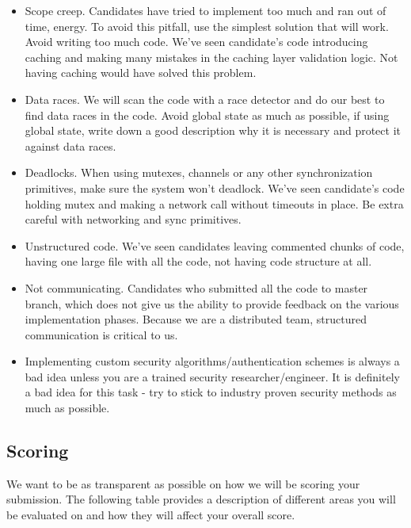 \documentclass{article}
\begin{document}
    \begin{itemize}
    \item Scope creep. Candidates have tried to implement too much and ran out of time, energy. To avoid this pitfall, use the simplest solution that will work. Avoid writing too much code. We've seen candidate's code introducing caching and making many mistakes in the caching layer validation logic. Not having caching would have solved this problem.
    \item Data races. We will scan the code with a race detector and do our best to find data races in the code. Avoid global state as much as possible, if using global state, write down a good description why it is necessary and protect it against data races.
    \item Deadlocks. When using mutexes, channels or any other synchronization primitives, make sure the system won't deadlock. We've seen candidate's code holding mutex and making a network call without timeouts in place. Be extra careful with networking and sync primitives.
    \item Unstructured code. We've seen candidates leaving commented chunks of code, having one large file with all the code, not having code structure at all.
    \item Not communicating. Candidates who submitted all the code to master branch, which does not give us the ability to provide feedback on the various implementation phases. Because we are a distributed team, structured communication is critical to us.
    \item Implementing custom security algorithms/authentication schemes is always a bad idea unless you are a trained security researcher/engineer. It is definitely a bad idea for this task - try to stick to industry proven security methods as much as possible.
    \end{itemize}

\subsection{Scoring}

We want to be as transparent as possible on how we will be scoring your submission.
The following table provides a description of different areas you will be evaluated on and how they will affect your overall score.
\end{document}
